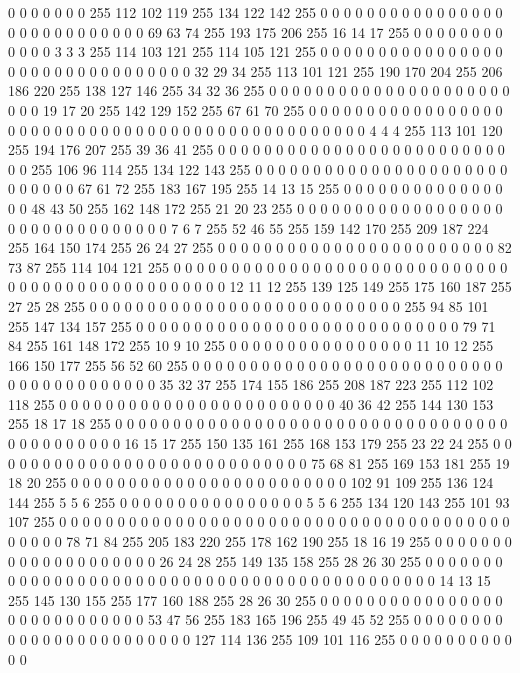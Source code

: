 0 0 0 0 0 0 0 255 112 102 119 255 134 122 142 255 0 0 0 0 0 0 0 0 0 0 0 0 0 0 0 0 0 0 0 0 0 0 0 0 0 0 0 0 69 63 74 255 193 175 206 255 16 14 17 255 0 0 0 0 0 0 0 0
0 0 0 0 3 3 3 255 114 103 121 255 114 105 121 255 0 0 0 0 0 0 0 0 0 0 0 0 0 0 0 0 0 0 0 0 0 0 0 0 0 0 0 0 0 0 0 0 32 29 34 255 113 101 121 255 190 170 204 255 206 186 220 255
138 127 146 255 34 32 36 255 0 0 0 0 0 0 0 0 0 0 0 0 0 0 0 0 0 0 0 0 0 0 0 0 19 17 20 255 142 129 152 255 67 61 70 255 0 0 0 0 0 0 0 0 0 0 0 0 0 0 0 0 0 0 0 0
0 0 0 0 0 0 0 0 0 0 0 0 0 0 0 0 0 0 0 0 0 0 0 0 0 0 0 0 4 4 4 255 113 101 120 255 194 176 207 255 39 36 41 255 0 0 0 0 0 0 0 0 0 0 0 0 0 0 0 0 0 0 0 0
0 0 0 0 0 0 0 255 106 96 114 255 134 122 143 255 0 0 0 0 0 0 0 0 0 0 0 0 0 0 0 0 0 0 0 0 0 0 0 0 0 0 0 0 67 61 72 255 183 167 195 255 14 13 15 255 0 0 0 0 0 0 0 0
0 0 0 0 0 0 0 0 48 43 50 255 162 148 172 255 21 20 23 255 0 0 0 0 0 0 0 0 0 0 0 0 0 0 0 0 0 0 0 0 0 0 0 0 0 0 0 0 0 0 0 0 7 6 7 255 52 46 55 255 159 142 170 255
209 187 224 255 164 150 174 255 26 24 27 255 0 0 0 0 0 0 0 0 0 0 0 0 0 0 0 0 0 0 0 0 0 0 0 0 82 73 87 255 114 104 121 255 0 0 0 0 0 0 0 0 0 0 0 0 0 0 0 0 0 0 0 0
0 0 0 0 0 0 0 0 0 0 0 0 0 0 0 0 0 0 0 0 0 0 0 0 0 0 0 0 12 11 12 255 139 125 149 255 175 160 187 255 27 25 28 255 0 0 0 0 0 0 0 0 0 0 0 0 0 0 0 0 0 0 0 0
0 0 0 0 0 0 0 255 94 85 101 255 147 134 157 255 0 0 0 0 0 0 0 0 0 0 0 0 0 0 0 0 0 0 0 0 0 0 0 0 0 0 0 0 79 71 84 255 161 148 172 255 10 9 10 255 0 0 0 0 0 0 0 0
0 0 0 0 0 0 0 0 11 10 12 255 166 150 177 255 56 52 60 255 0 0 0 0 0 0 0 0 0 0 0 0 0 0 0 0 0 0 0 0 0 0 0 0 0 0 0 0 0 0 0 0 0 0 0 0 0 0 0 0 35 32 37 255
174 155 186 255 208 187 223 255 112 102 118 255 0 0 0 0 0 0 0 0 0 0 0 0 0 0 0 0 0 0 0 0 0 0 0 0 40 36 42 255 144 130 153 255 18 17 18 255 0 0 0 0 0 0 0 0 0 0 0 0 0 0 0 0
0 0 0 0 0 0 0 0 0 0 0 0 0 0 0 0 0 0 0 0 0 0 0 0 0 0 0 0 16 15 17 255 150 135 161 255 168 153 179 255 23 22 24 255 0 0 0 0 0 0 0 0 0 0 0 0 0 0 0 0 0 0 0 0
0 0 0 0 0 0 0 0 75 68 81 255 169 153 181 255 19 18 20 255 0 0 0 0 0 0 0 0 0 0 0 0 0 0 0 0 0 0 0 0 0 0 0 0 102 91 109 255 136 124 144 255 5 5 6 255 0 0 0 0 0 0 0 0
0 0 0 0 0 0 0 0 5 5 6 255 134 120 143 255 101 93 107 255 0 0 0 0 0 0 0 0 0 0 0 0 0 0 0 0 0 0 0 0 0 0 0 0 0 0 0 0 0 0 0 0 0 0 0 0 0 0 0 0 0 0 0 0
78 71 84 255 205 183 220 255 178 162 190 255 18 16 19 255 0 0 0 0 0 0 0 0 0 0 0 0 0 0 0 0 0 0 0 0 26 24 28 255 149 135 158 255 28 26 30 255 0 0 0 0 0 0 0 0 0 0 0 0 0 0 0 0
0 0 0 0 0 0 0 0 0 0 0 0 0 0 0 0 0 0 0 0 0 0 0 0 0 0 0 0 14 13 15 255 145 130 155 255 177 160 188 255 28 26 30 255 0 0 0 0 0 0 0 0 0 0 0 0 0 0 0 0 0 0 0 0
0 0 0 0 0 0 0 0 53 47 56 255 183 165 196 255 49 45 52 255 0 0 0 0 0 0 0 0 0 0 0 0 0 0 0 0 0 0 0 0 0 0 0 0 127 114 136 255 109 101 116 255 0 0 0 0 0 0 0 0 0 0 0 0
